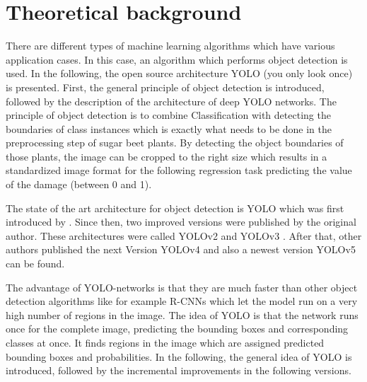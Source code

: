 
\chapter{Theoretical background}

There are different types of machine learning algorithms which have various application cases. In this case, an algorithm which performs object detection is used. In the following, the open source architecture YOLO (you only look once) is presented. First, the general principle of object detection is introduced, followed by the description of the architecture of deep YOLO networks. The principle of object detection is to combine Classification with detecting the boundaries of class instances which is exactly what needs to be done in the preprocessing step of sugar beet plants. By detecting the object boundaries of those plants, the image can be cropped to the right size which results in a standardized image format for the following regression task predicting the value of the damage (between 0 and 1).

The state of the art architecture for object detection is YOLO which was first introduced by \cite{yolov1}. Since then, two improved versions were published by the original author. These architectures were called YOLOv2 \cite{yolov2} and YOLOv3 \cite{yolov3}. After that, other authors published the next Version YOLOv4 \cite{yolov4} and also a newest version YOLOv5 can be found. 

The advantage of YOLO-networks is that they are much faster than other object detection algorithms like for example R-CNNs \cite{RCNN} which let the model run on a very high number of regions in the image. The idea of YOLO is that the network runs once for the complete image, predicting the bounding boxes and corresponding classes at once. It finds regions in the image which are assigned predicted bounding boxes and probabilities. In the following, the general idea of YOLO is introduced, followed by the incremental improvements in the following versions. 

